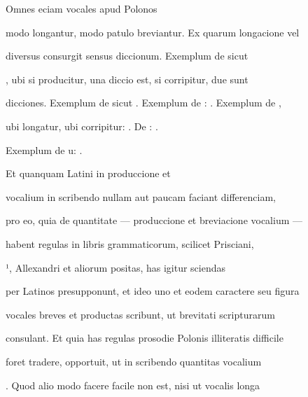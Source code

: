 \indentK Omnes eciam vocales apud Polonos

\fulllines{}

modo longantur, modo patulo breviantur. Ex quarum longacione vel 

 diversus consurgit sensus diccionum. Exemplum de  sicut 

, ubi si  producitur, una diccio est, si corripitur, due sunt

dicciones. Exemplum de  sicut  . Exemplum de :  . Exemplum de ,

ubi longatur, ubi corripitur:  . De :  .

\splitlines{}

Exemplum de u:  .

\indentK Et quanquam Latini in produccione et 

\fulllines{}

 vocalium in scribendo nullam aut paucam faciant differenciam,

pro eo, quia de quantitate — produccione et breviacione vocalium — 

 habent regulas in libris grammaticorum, scilicet Prisciani,


¹, Allexandri et aliorum positas, has igitur sciendas

per Latinos presupponunt, et ideo uno et eodem caractere seu figura

vocales breves et productas scribunt, ut brevitati scripturarum

consulant. Et quia has regulas prosodie Polonis illiteratis difficile

foret tradere, opportuit, ut in scribendo quantitas vocalium 

. Quod alio modo facere facile non est, nisi ut vocalis longa

